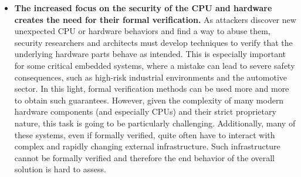 \begin{itemize}
		\item \textbf{The increased focus on the security of the CPU and hardware creates the need for their formal verification.} As attackers discover new unexpected CPU or hardware behaviors and find a way to abuse them, security researchers and architects must develop techniques to verify that the underlying hardware parts behave as intended. This is especially important for some critical embedded systems, where a mistake can lead to severe safety consequences, such as high-risk industrial environments and the automotive sector. In this light, formal verification methods can be used more and more to obtain such guarantees. However, given the complexity of many modern hardware components (and especially CPUs) and their strict proprietary nature, this task is going to be particularly challenging. Additionally, many of these systems, even if formally verified, quite often have to interact with complex and rapidly changing external infrastructure. Such infrastructure cannot be formally verified and therefore the end behavior of the overall solution is hard to assess.  	
		\end{itemize}
		
		
